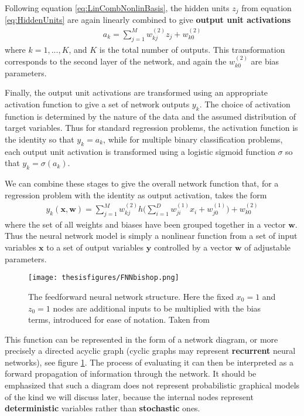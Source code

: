 \documentclass[twoside,english]{uiofysmaster}
\begin{document}
Following equation \ref{eq:LinCombNonlinBasis}, the hidden units $z_j$ from equation \ref{eq:HiddenUnits} are again linearly combined to give \textbf{output unit activations}
\begin{align}
	a_k = \sum_{j=1}^M w_{kj}^{(2)} z_j + w_{k0}^{(2)}
\end{align}
where $k=1, ..., K$, and $K$ is the total number of outputs. This transformation corresponds to the second layer of the network, and again the $w_{k0}^{(2)}$ are bias parameters. 

Finally, the output unit activations are transformed using an appropriate activation function to give a set of network outputs $y_k$. The choice of activation function is determined by the nature of the data and the assumed distribution of target variables. Thus for standard regression problems, the activation function is the identity so that $y_k = a_k$, while for multiple binary classification problems, each output unit activation is transformed using a logistic sigmoid function $\sigma$ so that $y_k = \sigma(a_k)$.

We can combine these stages to give the overall network function that, for a regression problem with the identity as output activation, takes the form
\begin{align}
	y_k (\bm{x}, \bm{w}) = \sum_{j=1}^M w_{kj}^{(2)} h \bigg (  \sum_{i=1}^D w_{ji}^{(1)} x_i + w_{j0}^{(1)}  \bigg) + w_{k0}^{(2)} 
\end{align}
where the set of all weights and biases have been grouped together in a vector $\bm{w}$. Thus the neural network model is simply a nonlinear function from a set of input variables $\bm{x}$ to a set of output variables $\bm{y}$ controlled by a vector $\bm{w}$ of adjustable parameters. 



\begin{figure}
\centering
 \texttt{[image: thesisfigures/FNNbishop.png]}
 \caption{The feedforward neural network structure. Here the fixed $x_0=1$ and $z_0=1$ nodes are additional inputs to be multiplied with the bias terms, introduced for ease of notation. Taken from \cite{Bishop2006}}
 \label{fig:FNNbishop}
\end{figure}




This function can be represented in the form of a network diagram, or more precisely a directed acyclic graph (cyclic graphs may represent \textbf{recurrent} neural networks), see figure \ref{fig:FNNbishop}. The process of evaluating it can then be interpreted as a forward propagation of information through the network. It should be emphasized that such a diagram does not represent probabilistic graphical models of the kind we will discuss later, because the internal nodes represent \textbf{deterministic} variables rather than \textbf{stochastic} ones. 
\end{document}
